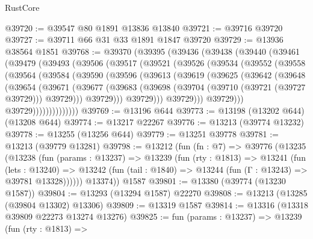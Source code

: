 \begin{lexlean}{RustCore}
\begin{coremodule}
@39720 := @39547 @80 @1891 @13836 @13840
@39721 := @39716 @39720
@39727 := @39711 @66 @31 @33 @1891 @1847 @39720
@39729 := @13936 @38564 @1851
@39768 := @39370
    (@39395
      (@39436
        (@39438
          (@39440
            (@39461
              (@39479
                (@39493
                  (@39506
                    (@39517
                      (@39521
                        (@39526
                          (@39534
                            (@39552
                              (@39558
                                (@39564
                                  (@39584
                                    (@39590
                                      (@39596
                                        (@39613
                                          (@39619
                                            (@39625
                                              (@39642
                                                (@39648
                                                  (@39654
                                                    (@39671
                                                      (@39677
                                                        (@39683
                                                          (@39698
                                                            (@39704
                                                              (@39710 (@39721 (@39727 @39729)))
                                                              @39729)))
                                                        @39729)))
                                                  @39729)))
                                            @39729)))
                                      @39729)))
                                @39729))))))))))))))
@39769 := @13196 @644
@39773 := @13198 (@13202 @644) (@13208 @644)
@39774 := @13217 @22267
@39776 := @13213 (@39774 @13232)
@39778 := @13255 (@13256 @644)
@39779 := @13251 @39778
@39781 := @13213 (@39779 @13281)
@39798 := @13212
    (fun (fn : @7) =>
    @39776
      (@13235
        (@13238
          (fun (params : @13237) =>
          @13239
            (fun (rty : @1813) =>
            @13241
              (fun (lets : @13240) =>
              @13242 (fun (tail : @1840) => @13244 (fun (Γ : @13243) => @39781 @13328))))))
        @13374))
    @1587
@39801 := @13380 (@39774 (@13230 @1587))
@39804 := @13293 (@13294 @1587) @22270
@39808 := @13213 (@13285 (@39804 @13302) @13306)
@39809 := @13319 @1587
@39814 := @13316 (@13318 @39809 @22273 @13274 @13276)
@39825 := fun (params : @13237) =>
  @13239
    (fun (rty : @1813) =>

\end{coremodule}
\end{lexlean}
